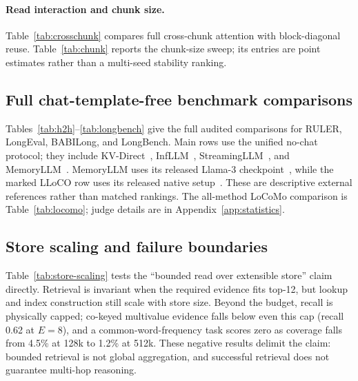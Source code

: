 \paragraph{Read interaction and chunk size.}
Table~\ref{tab:crosschunk} compares full cross-chunk attention with
block-diagonal reuse. Table~\ref{tab:chunk} reports the chunk-size sweep; its
entries are point estimates rather than a multi-seed stability ranking.



\FloatBarrier
\subsection{Full chat-template-free benchmark comparisons}
\label{app:tasks}
Tables~\ref{tab:h2h}--\ref{tab:longbench} give the full audited comparisons for
RULER, LongEval, BABILong, and LongBench. Main rows use the unified no-chat
protocol; they include KV-Direct~\citep{kvdirect}, InfLLM~\citep{infllm},
StreamingLLM~\citep{streamingllm}, and MemoryLLM~\citep{memoryllm}. MemoryLLM
uses its released Llama-3 checkpoint~\citep{llama3}, while the marked LLoCO
row uses its released native setup~\citep{lloco}. These are descriptive external
references rather than matched rankings.
The all-method LoCoMo comparison is Table~\ref{tab:locomo}; judge details are in
Appendix~\ref{app:statistics}.








\FloatBarrier
\subsection{Store scaling and failure boundaries}
\label{app:scaling}
Table~\ref{tab:store-scaling} tests the ``bounded read over extensible store''
claim directly. Retrieval is invariant when the required evidence fits top-12,
but lookup and index construction still scale with store size. Beyond the budget,
recall is physically capped; co-keyed multivalue evidence falls below even this
cap (recall 0.62 at $E{=}8$), and a common-word-frequency task scores zero as
coverage falls from 4.5\% at 128k to 1.2\% at 512k. These negative results delimit
the claim: bounded retrieval is not global aggregation, and successful retrieval
does not guarantee multi-hop reasoning.



